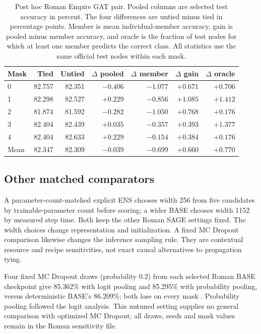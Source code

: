 \begin{table}[h]
\centering
\caption{Post hoc Roman Empire GAT pair. Pooled columns are selected test accuracy in percent. The four differences are untied minus tied in percentage points. Member is mean individual-member accuracy, gain is pooled minus member accuracy, and oracle is the fraction of test nodes for which at least one member predicts the correct class. All statistics use the same official test nodes within each mask.}
\label{tab:gat-pair}
\setlength{\tabcolsep}{4pt}
\small
\begin{tabular}{lrrrrrr}
\toprule
Mask & Tied & Untied & $\Delta$ pooled & $\Delta$ member & $\Delta$ gain & $\Delta$ oracle\\
\midrule
0 & 82.757 & 82.351 & $-0.406$ & $-1.077$ & $+0.671$ & $+0.706$\\
1 & 82.298 & 82.527 & $+0.229$ & $-0.856$ & $+1.085$ & $+1.412$\\
2 & 81.874 & 81.592 & $-0.282$ & $-1.050$ & $+0.768$ & $+0.176$\\
3 & 82.404 & 82.439 & $+0.035$ & $-0.357$ & $+0.393$ & $+1.377$\\
4 & 82.404 & 82.633 & $+0.229$ & $-0.154$ & $+0.384$ & $+0.176$\\
\midrule
Mean & 82.347 & 82.309 & $-0.039$ & $-0.699$ & $+0.660$ & $+0.770$\\
\bottomrule
\end{tabular}
\end{table}

\subsection{Other matched comparators}\label{app:param-matched}
A parameter-count-matched explicit ENS chooses width 256 from five
candidates by trainable-parameter count before scoring; a wider BASE
chooses width 1152 by measured step time. Both keep the other Roman
SAGE settings fixed. The width choices change representation and
initialization. A fixed MC Dropout comparison likewise changes the
inference sampling rule. They are contextual resource and recipe
sensitivities, not exact causal alternatives to propagation tying.
\label{app:mc-dropout}\label{app:strong-base}

Four fixed MC Dropout draws (probability 0.2) from each selected Roman BASE checkpoint give 85.362\% with logit pooling and 85.295\% with probability pooling, versus deterministic BASE's 86.209\%; both lose on every mask \citep{gal2016dropout}. Probability pooling followed the logit analysis. This untuned setting supplies no general comparison with optimized MC Dropout; all draws, seeds and mask values remain in the Roman sensitivity file.

